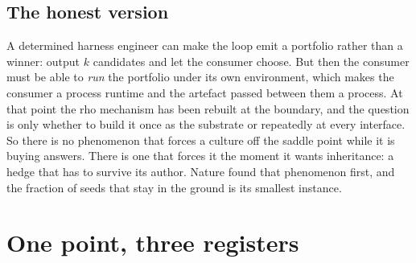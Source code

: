 \documentclass[11pt]{article}
\theoremstyle{plain}
\theoremstyle{definition}
\theoremstyle{remark}
\begin{document}
\subsection{The honest version}

A determined harness engineer can make the loop emit a portfolio rather than
a winner: output $k$ candidates and let the consumer choose. But then the
consumer must be able to \emph{run} the portfolio under its own environment,
which makes the consumer a process runtime and the artefact passed between
them a process. At that point the rho mechanism has been rebuilt at the
boundary, and the question is only whether to build it once as the substrate
or repeatedly at every interface. So there is no phenomenon that forces a
culture off the saddle point while it is buying answers. There is one that
forces it the moment it wants inheritance: a hedge that has to survive its
author. Nature found that phenomenon first, and the fraction of seeds that
stay in the ground is its smallest instance.

\section{One point, three registers}\label{sec:one}
\end{document}
